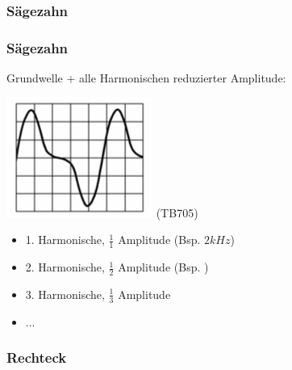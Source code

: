 \subsubsection{Sägezahn}

\begin{frame}
    \frametitle{Sägezahn}

    Grundwelle + alle Harmonischen reduzierter Amplitude:


    \begin{center}
        \includegraphics[width=\textwidth,height=0.5\textheight,keepaspectratio]{a11/TB705.png}
        \tiny (TB705)
    \end{center}

    \begin{itemize}
        \item 1. Harmonische, $\frac{1}{1}$ Amplitude (Bsp. $2kHz$)
        \item 2. Harmonische, $\frac{1}{2}$ Amplitude (Bsp. 
                                                            )
        \item 3. Harmonische, $\frac{1}{3}$ Amplitude
        \item ...
    \end{itemize}

\end{frame}

\subsubsection{Rechteck}

